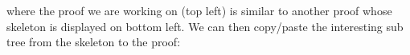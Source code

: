 where the proof we are working on (top left) is similar to another proof whose skeleton is displayed on bottom left. We can then copy/paste the interesting sub tree from the skeleton to the proof: 




